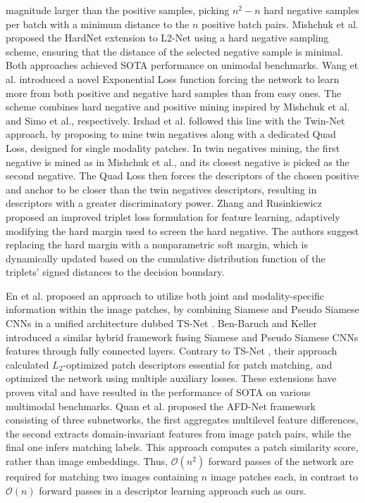 \documentclass[10pt,journal]{IEEEtran}\usepackage{amsfonts}
\begin{document}
magnitude larger than the positive samples, picking $n^{2}-n$ hard negative
samples per batch with a minimum distance to the $n$ positive batch pairs.
Mishchuk et al. proposed the HardNet extension \cite{HardNet} to L2-Net \cite {L2Net} using a hard negative sampling scheme, ensuring that the distance of
the selected negative sample is minimal. Both approaches achieved SOTA
performance on unimodal benchmarks. Wang et al. introduced a novel
Exponential Loss function \cite{BetterAndFaster} forcing the network to
learn more from both positive and negative hard samples than from easy ones.
The scheme combines hard negative and positive mining inspired by Mishchuk
et al.\cite{HardNet} and Simo et al.\cite{SimoSerra}, respectively. Irshad
et al. followed this line with the Twin-Net \cite{Twin_net} approach, by
proposing to mine twin negatives along with a dedicated Quad Loss, designed
for single modality patches. In twin negatives mining, the first negative is
mined as in Mishchuk et al.\cite{HardNet}, and its closest negative is
picked as the second negative. The Quad Loss then forces the descriptors of
the chosen positive and anchor to be closer than the twin negatives
descriptors, resulting in descriptors with a greater discriminatory power.
Zhang and Rusinkiewicz \cite{ZhangCDF} proposed an improved triplet loss
formulation for feature learning, adaptively modifying the hard margin used
to screen the hard negative. The authors suggest replacing the hard margin
with a nonparametric soft margin, which is dynamically updated based on the
cumulative distribution function of the triplets' signed distances to the
decision boundary.

En et al. proposed an approach to utilize both joint and modality-specific
information within the image patches, by combining Siamese and Pseudo
Siamese CNNs in a unified architecture dubbed TS-Net \cite{TS-net}.
Ben-Baruch and Keller \cite{multisensor} introduced a similar hybrid
framework fusing Siamese and Pseudo Siamese CNNs features through fully
connected layers. Contrary to TS-Net \cite{TS-net}, their approach
calculated $L_{2}$-optimized patch descriptors essential for patch matching,
and optimized the network using multiple auxiliary losses. These extensions
have proven vital and have resulted in the performance of SOTA on various
multimodal benchmarks. Quan et al. proposed the AFD-Net framework \cite {AFD_net} consisting of three subnetworks, the first aggregates multilevel
feature differences, the second extracts domain-invariant features from
image patch pairs, while the final one infers matching labels. This approach
computes a patch similarity score, rather than image embeddings. Thus, $\mathcal{O}(n^{2})$ forward passes of the network are required for matching
two images containing $n$ image patches each, in contrast to $\mathcal{O}(n)$
forward passes in a descriptor learning approach such as ours.
\end{document}
